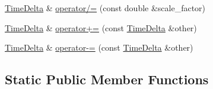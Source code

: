 \begin{DoxyCompactItemize}
\item 
\hyperlink{structTimeDelta}{\-Time\-Delta} \& \hyperlink{structTimeDelta_ae514c2f5fa4266b53bb0220b89e50e54}{operator/=} (const double \&scale\-\_\-factor)
\item 
\hyperlink{structTimeDelta}{\-Time\-Delta} \& \hyperlink{structTimeDelta_ae8d415b1d359e1f6c6a68ee3c44ea21e}{operator+=} (const \hyperlink{structTimeDelta}{\-Time\-Delta} \&other)
\item 
\hyperlink{structTimeDelta}{\-Time\-Delta} \& \hyperlink{structTimeDelta_adcacf2fa162c98c9a8c7278f0e32ce56}{operator-\/=} (const \hyperlink{structTimeDelta}{\-Time\-Delta} \&other)
\end{DoxyCompactItemize}
\subsection*{\-Static \-Public \-Member \-Functions}
